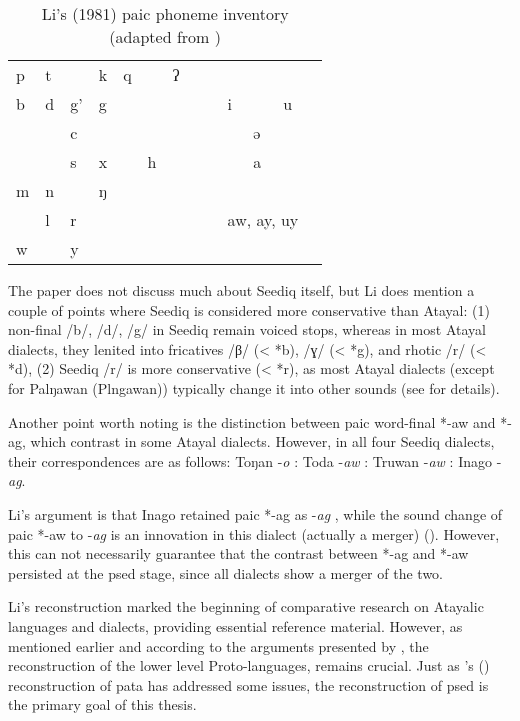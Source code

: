 \begingroup
{}
\renewcommand\arraystretch{1.5}
\begin{table}[H]
\centering
\caption{Li's (1981) \acl{paic} phoneme inventory (adapted from \cite[272]{li1981paic})}
\label{tab:lipaic}
\begin{tabular}{lllllllllllll}
\hline
p & t &    & k & q &   & ʔ &  &  &          &          &          &  \\
b & d & g' & g &   &   &   &  &  & i        &          & u        &  \\
  &   & c  &   &   &   &   &  &  &          & ə        &          &  \\
  &   & s  & x &   & h &   &  &  &          & a        &          &  \\
m & n &    & ŋ &   &   &   &  &  &          &          &          &  \\
  & l & r  &   &   &   &   &  &  & \multicolumn{3}{l}{aw, ay, uy} &  \\
w &   & y  &   &   &   &   &  &  &          &          &          &  \\ \hline
\end{tabular}
\end{table}
\endgroup

The paper does not discuss much about Seediq itself, but Li does mention a couple of points where Seediq is considered more conservative than Atayal: (1) non-final /b/, /d/, /g/ in Seediq remain voiced stops, whereas in most Atayal dialects, they lenited into fricatives /β/ (< *b), /ɣ/ (< *g), and rhotic /r/ (< *d), (2) Seediq /r/ is more conservative (< *r), as most Atayal dialects (except for Palŋawan (Plngawan)) typically change it into other sounds (see \cite[264--265]{li1981paic} for details).

Another point worth noting is the distinction between \acl{paic} word-final *-aw and *-ag, which contrast in some Atayal dialects. However, in all four Seediq dialects, their correspondences are as follows: Toŋan -\textit{o} : Toda -\textit{aw} : Truwan -\textit{aw} : Inago -\textit{ag}.

Li's argument is that Inago retained \ac{paic} *-ag as -\textit{ag} , while the sound change of \ac{paic} *-aw to -\textit{ag} is an innovation in this dialect (actually a merger) (\cite[257--258,271]{li1981paic}). However, this can not necessarily guarantee that the contrast between *-ag and *-aw persisted at the \acl{psed} stage, since all dialects show a merger of the two.

Li's reconstruction marked the beginning of comparative research on Atayalic languages and dialects, providing essential reference material. However, as mentioned earlier and according to the arguments presented by \textcite{song2022Aicd,song2023Aicgprime}, the reconstruction of the lower level Proto-languages, remains crucial. Just as \citeauthor{goderich2020phd}'s (\citeyear{goderich2020phd}) reconstruction of \acl{pata} has addressed some issues, the reconstruction of \acl{psed} is the primary goal of this thesis.

